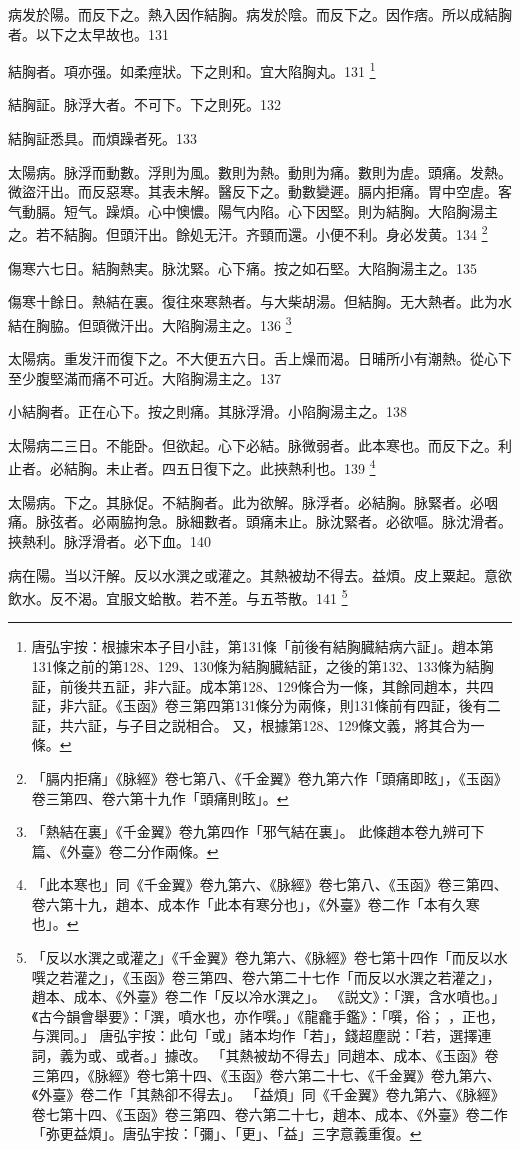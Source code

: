 病发於陽。而反下之。熱入因作結胸。病发於陰。而反下之。因作痞。所以成結胸者。以下之太早故也。131

結胸者。項亦强。如柔痙狀。下之則和。宜大陷胸丸。131
	\footnote{
		唐弘宇按：根據宋本子目小註，第131條「前後有結胸臓結病六証」。趙本第131條之前的第128、129、130條为結胸臓結証，之後的第132、133條为結胸証，前後共五証，非六証。成本第128、129條合为一條，其餘同趙本，共四証，非六証。《玉函》卷三第四第131條分为兩條，則131條前有四証，後有二証，共六証，与子目之説相合。
		又，根據第128、129條文義，將其合为一條。
	}

結胸証。脉浮大者。不可下。下之則死。132

結胸証悉具。而煩躁者死。133

太陽病。脉浮而動數。浮則为風。數則为熱。動則为痛。數則为虗。頭痛。发熱。微盜汗出。而反惡寒。其表未解。醫反下之。動數變遲。膈内拒痛。胃中空虗。客气動膈。短气。躁煩。心中懊憹。陽气内陷。心下因堅。則为結胸。大陷胸湯主之。若不結胸。但頭汗出。餘処无汗。齐頸而還。小便不利。身必发黄。134
	\footnote{
		「膈内拒痛」《脉經》卷七第八、《千金翼》卷九第六作「頭痛即眩」，《玉函》卷三第四、卷六第十九作「頭痛則眩」。
	}

傷寒六七日。結胸熱実。脉沈緊。心下痛。按之如石堅。大陷胸湯主之。135

傷寒十餘日。熱結在裏。復往來寒熱者。与大柴胡湯。但結胸。无大熱者。此为水結在胸脇。{\khaaitp 但}頭微汗出。大陷胸湯主之。136
	\footnote{
		「熱結在裏」《千金翼》卷九第四作「邪气結在裏」。
		此條趙本卷九辨可下篇、《外臺》卷二分作兩條。
	}

太陽病。重发汗而復下之。不大便五六日。舌上燥而渴。日晡所小有潮熱。從心下至少腹堅滿而痛不可近。大陷胸湯主之。137

小結胸者。正在心下。按之則痛。其脉浮滑。小陷胸湯主之。138

太陽病二三日。不能卧。但欲起。心下必結。脉微弱者。此本寒也。而反下之。利止者。必結胸。未止者。四五日復下之。此挾熱利也。139
	\footnote{
		「此本寒也」同《千金翼》卷九第六、《脉經》卷七第八、《玉函》卷三第四、卷六第十九，趙本、成本作「此本有寒分也」，《外臺》卷二作「本有久寒也」。
	}

太陽病。下之。其脉促。不結胸者。此为欲解。脉浮者。必結胸。脉緊者。必咽痛。脉弦者。必兩脇拘急。脉細數者。頭痛未止。脉沈緊者。必欲嘔。脉沈滑者。挾熱利。脉浮滑者。必下血。140

病在陽。当以汗解。反以水潠之或灌之。其熱被劫不得去。益煩。皮上粟起。意欲飲水。反不渴。宜服文蛤散。若不差。与五苓散。141
	\footnote{
		「反以水潠之或灌之」《千金翼》卷九第六、《脉經》卷七第十四作「而反以水噀之若灌之」，《玉函》卷三第四、卷六第二十七作「而反以水潠之若灌之」，趙本、成本、《外臺》卷二作「反以冷水潠之」。
		《説文》：「潠，含水噴也。」《古今韻會舉要》：「潠，噴水也，亦作噀。」《龍龕手鑑》：「噀，俗；{\sungtpii 𠹀}，正也，与潠同。」
		唐弘宇按：此句「或」諸本均作「若」，錢超塵説：「若，選擇連詞，義为或、或者。」據改。
		「其熱被劫不得去」同趙本、成本、《玉函》卷三第四，《脉經》卷七第十四、《玉函》卷六第二十七、《千金翼》卷九第六、《外臺》卷二作「其熱卻不得去」。
		「益煩」同《千金翼》卷九第六、《脉經》卷七第十四、《玉函》卷三第四、卷六第二十七，趙本、成本、《外臺》卷二作「弥更益煩」。唐弘宇按：「彌」、「更」、「益」三字意義重復。
	}

